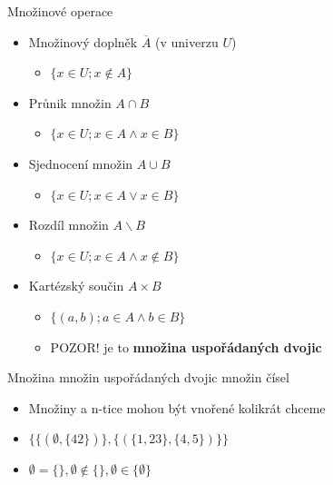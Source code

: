\documentclass[aspectratio=1610]{beamer}
\begin{document}
\begin{frame}{Množinové operace}

\begin{itemize}
  \item Množinový doplněk $\overline{A}$ (v univerzu $\mathit{U}$) \begin{itemize}
      \item<2-> $\{x \in \mathit{U}; x \notin A\}$
    \end{itemize}
  \item Průnik množin $A \cap B$ \begin{itemize}
      \item<3-> $\{x \in \mathit{U}; x \in A \land x \in B\}$
    \end{itemize}
  \item Sjednocení množin $A \cup B$ \begin{itemize}
      \item<4-> $\{x \in \mathit{U}; x \in A \lor x \in B\}$
    \end{itemize}
  \item Rozdíl množin $A \backslash B$ \begin{itemize}
      \item<5-> $\{x \in \mathit{U}; x \in A \land x \notin B\}$
    \end{itemize}
  \item Kartézský součin $A \times B$ \begin{itemize}
      \item<6-> $\{(a, b); a \in A \land b \in B\}$
      \item<7-> POZOR! je to \textbf{množina uspořádaných dvojic}
    \end{itemize}
\end{itemize}

\end{frame}

\begin{frame}{Množina množin uspořádaných dvojic množin čísel}

\begin{itemize}
  \item Množiny a n-tice mohou být vnořené kolikrát chceme
  \item $\{\{(\emptyset, \{42\})\}, \{(\{1,2 3\}, \{4, 5\})\}\}$
  \item $\emptyset = \{\}, \emptyset \notin \{\}, \emptyset \in \{\emptyset\}$
\end{itemize}

\end{frame}
\end{document}
